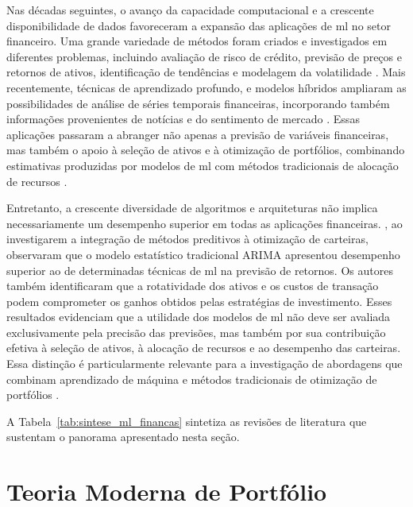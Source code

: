 Nas décadas seguintes, o avanço da capacidade computacional e a crescente disponibilidade de dados favoreceram a expansão das aplicações de \acs{ml} no setor financeiro. Uma grande variedade de métodos foram criados e investigados em diferentes problemas, incluindo avaliação de risco de crédito, previsão de preços e retornos de ativos, identificação de tendências e modelagem da volatilidade \cite{manogna2024bibliometric,kumar2025decennaries}. Mais recentemente, técnicas de aprendizado profundo, e modelos híbridos ampliaram as possibilidades de análise de séries temporais financeiras, incorporando também informações provenientes de notícias e do sentimento de mercado \cite{balasubramanian2024survey,manogna2024bibliometric}. Essas aplicações passaram a abranger não apenas a previsão de variáveis financeiras, mas também o apoio à seleção de ativos e à otimização de portfólios, combinando estimativas produzidas por modelos de \acs{ml} com métodos tradicionais de alocação de recursos \cite{ma2021portfolio}.

Entretanto, a crescente diversidade de algoritmos e arquiteturas não implica necessariamente um desempenho superior em todas as aplicações financeiras. , ao investigarem a integração de métodos preditivos à otimização de carteiras, observaram que o modelo estatístico tradicional ARIMA apresentou desempenho superior ao de determinadas técnicas de \acs{ml} na previsão de retornos. Os autores também identificaram que a rotatividade dos ativos e os custos de transação podem comprometer os ganhos obtidos pelas estratégias de investimento. Esses resultados evidenciam que a utilidade dos modelos de \acs{ml} não deve ser avaliada exclusivamente pela precisão das previsões, mas também por sua contribuição efetiva à seleção de ativos, à alocação de recursos e ao desempenho das carteiras. Essa distinção é particularmente relevante para a investigação de abordagens que combinam aprendizado de máquina e métodos tradicionais de otimização de portfólios \cite{ma2021portfolio}.

A Tabela~\ref{tab:sintese_ml_financas} sintetiza as revisões de literatura que sustentam o panorama apresentado nesta seção.



\section{Teoria Moderna de Portfólio}
\label{sec_teoria_moderna_de_portfolio}

